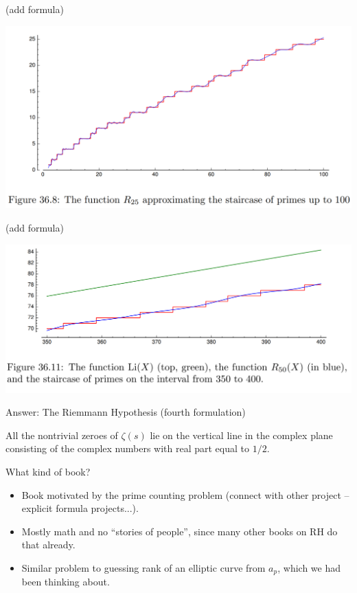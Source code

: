 \documentclass{beamer}
\begin{document}
\begin{frame}{}

(add formula)

\includegraphics[height=.65\textheight]{pics/R25-approx.png}

\end{frame}


\begin{frame}{}

(add formula)

\includegraphics[height=.55\textheight]{pics/Li-R50-pi.png}

\end{frame}



\begin{frame}{Answer: The Riemmann Hypothesis (fourth formulation)}
  \begin{block}{}
    All the nontrivial zeroes of $\zeta(s)$ lie on the vertical
    line in the complex plane consisting of the
    complex numbers with real part equal to $1/2$.
  \end{block}
\end{frame}


\begin{frame}{What kind of book?}
  \begin{itemize}
    \item   Book motivated by the prime counting problem (connect with other project -- explicit formula projects...).
    \item Mostly math and no ``stories of people'', since many other books on RH do that already.
    \item Similar problem to guessing rank of an elliptic curve from $a_p$, which we had been thinking about.
  \end{itemize}
\end{frame}
\end{document}
